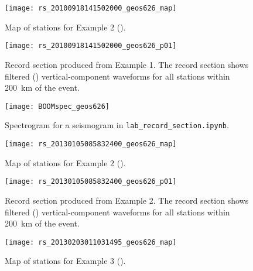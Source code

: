 \documentclass[11pt,titlepage,fleqn]{article}
\newcommand{\tfile}{{\tt lab\_record\_section.ipynb}}
\begin{document}



\clearpage\pagebreak
\begin{figure}
\centering
\texttt{[image: rs\_20100918141502000\_geos626\_map]}
\caption[]
{{
Map of stations for Example 2 ().
}}
\label{fig:map_ex01}
\end{figure}

\clearpage\pagebreak
\begin{figure}
\hspace{-1.25cm}
\texttt{[image: rs\_20100918141502000\_geos626\_p01]}
\caption[]
{{
Record section produced from Example 1.
The record section shows filtered () vertical-component waveforms for all stations within 200~km of the event.
}}
\label{fig:rs_ex01}
\end{figure}

\clearpage\pagebreak
\begin{figure}
\centering
\texttt{[image: BOOMspec\_geos626]}
\caption[]
{{
Spectrogram for a seismogram in \tfile.
}}
\label{fig:BOOM}
\end{figure}


\clearpage\pagebreak
\begin{figure}
\centering
\texttt{[image: rs\_20130105085832400\_geos626\_map]}
\caption[]
{{
Map of stations for Example 2 ().
}}
\label{fig:map_ex02}
\end{figure}

\clearpage\pagebreak
\begin{figure}
\hspace{-1.25cm}
\texttt{[image: rs\_20130105085832400\_geos626\_p01]}
\caption[]
{{
Record section produced from Example 2.
The record section shows filtered () vertical-component waveforms for all stations within 200~km of the event.
}}
\label{fig:rs_ex02}
\end{figure}


\clearpage\pagebreak
\begin{figure}
\centering
\texttt{[image: rs\_20130203011031495\_geos626\_map]}
\caption[]
{{
Map of stations for Example 3 ().
}}
\label{fig:map_ex03}
\end{figure}
\end{document}
